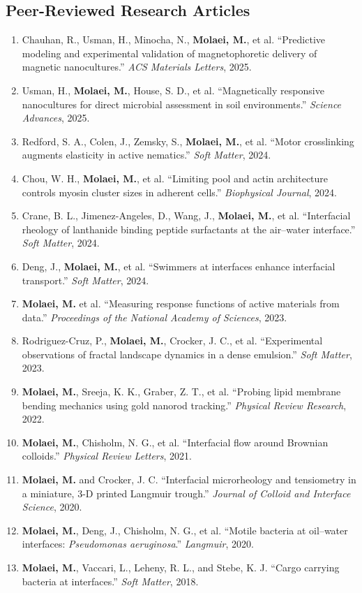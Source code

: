 \documentclass[11pt]{article}
\newlength{\cvindent}
\newenvironment{cvblock}{%
  \begin{list}{}{%
    \setlength{\leftmargin}{\cvindent}%
    \setlength{\rightmargin}{0pt}%
    \setlength{\labelwidth}{0pt}%
    \setlength{\labelsep}{0pt}%
    \setlength{\itemindent}{0pt}%
    \setlength{\listparindent}{0pt}%
    \setlength{\topsep}{0pt}%
    \setlength{\partopsep}{0pt}%
    \setlength{\parsep}{0pt}%
    \setlength{\itemsep}{0pt}%
  }
  \item[]
}{%
  \end{list}
}
\newcommand{\pubitem}[1]{\item #1}
\begin{document}
\subsection*{Peer-Reviewed Research Articles}
\begin{cvblock}
\begin{enumerate}
    \pubitem{Chauhan, R., Usman, H., Minocha, N., \textbf{Molaei, M.}, et al. ``Predictive modeling and experimental validation of magnetophoretic delivery of magnetic nanocultures.'' \textit{ACS Materials Letters}, 2025.}
    \pubitem{Usman, H., \textbf{Molaei, M.}, House, S. D., et al. ``Magnetically responsive nanocultures for direct microbial assessment in soil environments.'' \textit{Science Advances}, 2025.}
    \pubitem{Redford, S. A., Colen, J., Zemsky, S., \textbf{Molaei, M.}, et al. ``Motor crosslinking augments elasticity in active nematics.'' \textit{Soft Matter}, 2024.}
    \pubitem{Chou, W. H., \textbf{Molaei, M.}, et al. ``Limiting pool and actin architecture controls myosin cluster sizes in adherent cells.'' \textit{Biophysical Journal}, 2024.}
    \pubitem{Crane, B. L., Jimenez-Angeles, D., Wang, J., \textbf{Molaei, M.}, et al. ``Interfacial rheology of lanthanide binding peptide surfactants at the air--water interface.'' \textit{Soft Matter}, 2024.}
    \pubitem{Deng, J., \textbf{Molaei, M.}, et al. ``Swimmers at interfaces enhance interfacial transport.'' \textit{Soft Matter}, 2024.}
    \pubitem{\textbf{Molaei, M.} et al. ``Measuring response functions of active materials from data.'' \textit{Proceedings of the National Academy of Sciences}, 2023.}
    \pubitem{Rodriguez-Cruz, P., \textbf{Molaei, M.}, Crocker, J. C., et al. ``Experimental observations of fractal landscape dynamics in a dense emulsion.'' \textit{Soft Matter}, 2023.}
    \pubitem{\textbf{Molaei, M.}, Sreeja, K. K., Graber, Z. T., et al. ``Probing lipid membrane bending mechanics using gold nanorod tracking.'' \textit{Physical Review Research}, 2022.}
    \pubitem{\textbf{Molaei, M.}, Chisholm, N. G., et al. ``Interfacial flow around Brownian colloids.'' \textit{Physical Review Letters}, 2021.}
    \pubitem{\textbf{Molaei, M.} and Crocker, J. C. ``Interfacial microrheology and tensiometry in a miniature, 3-D printed Langmuir trough.'' \textit{Journal of Colloid and Interface Science}, 2020.}
    \pubitem{\textbf{Molaei, M.}, Deng, J., Chisholm, N. G., et al. ``Motile bacteria at oil--water interfaces: \textit{Pseudomonas aeruginosa}.'' \textit{Langmuir}, 2020.}
    \pubitem{\textbf{Molaei, M.}, Vaccari, L., Leheny, R. L., and Stebe, K. J. ``Cargo carrying bacteria at interfaces.'' \textit{Soft Matter}, 2018.}

\end{enumerate}
\end{cvblock}
\end{document}
